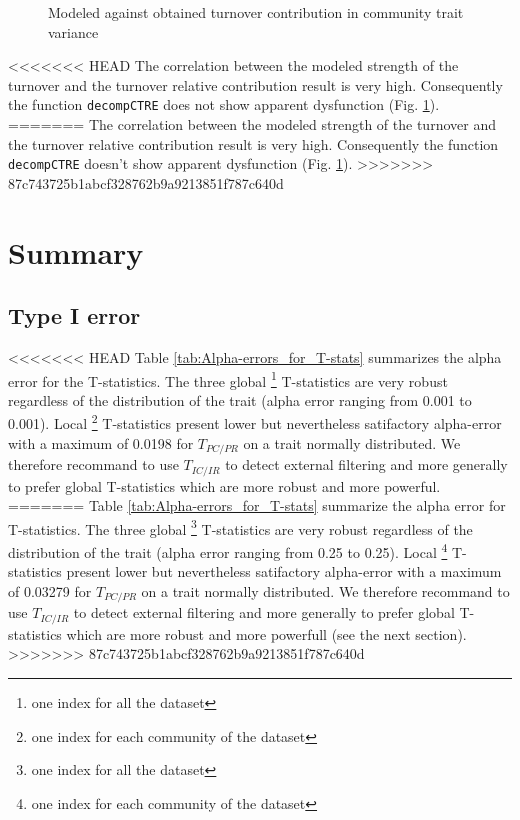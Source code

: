 \documentclass[12pt]{article}\usepackage[]{graphicx}\usepackage[]{color}
\newenvironment{knitrout}{}{} %
\begin{document}
\begin{landscape}
\begin{table}[ht]
{\begin{table}[ht]
{\begin{table}[ht]
{\begin{table}[h!]
\begin{center}
\begin{knitrout}
\begin{figure}
{}

\caption[Modeled against obtained turnover contribution in community trait variance]{Modeled against obtained turnover contribution in community trait variance}\label{fig:decompCTRE_plot2}
\end{figure}


\end{knitrout}

<<<<<<< HEAD
The correlation between the modeled strength of the turnover and the turnover relative contribution result is very high. Consequently the function \texttt{decompCTRE} does not show apparent dysfunction (Fig. \ref{fig:decompCTRE_plot2}).
=======
The correlation between the modeled strength of the turnover and the turnover relative contribution result is very high. Consequently the function \texttt{decompCTRE} doesn't show apparent dysfunction (Fig. \ref{fig:decompCTRE_plot2}).
>>>>>>> 87c743725b1abcf328762b9a9213851f787c640d

\cleardoublepage


\section{Summary}
\label{sect:summary}

\subsection{Type I error}

<<<<<<< HEAD
Table \ref{tab:Alpha-errors_for_T-stats} summarizes the alpha error for the T-statistics. The three global \footnote{one index for all the dataset} T-statistics are very robust 
regardless of the distribution of the trait (alpha error ranging from 0.001 to 0.001). Local \footnote{one index for each community of the dataset} T-statistics present lower but nevertheless satifactory alpha-error with a maximum of 0.0198 for $T_{PC/PR}$ on a trait normally distributed. We therefore recommand to use $T_{IC/IR}$ to detect external filtering and more generally to prefer global T-statistics which are more robust and more powerful.
=======
Table \ref{tab:Alpha-errors_for_T-stats} summarize the alpha error for T-statistics. The three global \footnote{one index for all the dataset} T-statistics are very robust 
regardless of the distribution of the trait (alpha error ranging from 0.25 to 0.25). Local \footnote{one index for each community of the dataset} T-statistics present lower but nevertheless satifactory alpha-error with a maximum of 0.03279 for $T_{PC/PR}$ on a trait normally distributed. We therefore recommand to use $T_{IC/IR}$ to detect external filtering and more generally to prefer global T-statistics which are more robust and more powerfull (see the next section).
>>>>>>> 87c743725b1abcf328762b9a9213851f787c640d



\end{center}
\end{table}}
\end{table}}
\end{table}}
\end{table}
\end{landscape}
\end{document}
